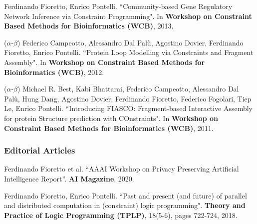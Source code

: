 \item 
	Ferdinando Fioretto, Enrico Pontelli. 
	{``Community-based Gene Regulatory Network Inference via Constraint Programming"}. 
	In \textbf{Workshop on Constraint Based Methods for Bioinformatics (WCB)}, 2013. 

\item 
	($\alpha$-$\beta$) 
	Federico Campeotto, Alessandro Dal Pal\`{u}, Agostino Dovier, Ferdinando Fioretto, Enrico Pontelli. 
	{``Protein Loop Modelling via Constraints and Fragment Assembly"}.
	In \textbf{Workshop on Constraint Based Methods for Bioinformatics (WCB)}, 2012. 

\item 
	($\alpha$-$\beta$) 
	Michael R. Best, Kabi Bhattarai, Federico Campeotto, Alessandro Dal Pal\`{u}, Hung Dang, Agostino Dovier, Ferdinando Fioretto, Federico Fogolari, Tiep Le, Enrico Pontelli.
		{``Introducing FIASCO: Fragment-based Interactive Assembly for protein Structure prediction with COnstraints"}.
 	 In \textbf{Workshop on Constraint Based Methods for  Bioinformatics (WCB)}, 2011.   
  
\endEnum


\subsubsection*{\sc Editorial Articles}
\renewcommand{\labelenumi}{e\theenumi.} 
\beginEnum
\item Ferdinando Fioretto et al.
	{``AAAI Workshop on Privacy Preserving Artificial Intelligence Report''}.
	{\bf AI Magazine}, 2020.

\item 
	Ferdinando Fioretto, Enrico Pontelli. 
	{``Past and present (and future) of parallel and distributed computation in (constraint) logic programming"}. 
	{\bf Theory and Practice of Logic Programming (TPLP)}, 18(5-6), pages 722-724, 2018.
\endEnum

